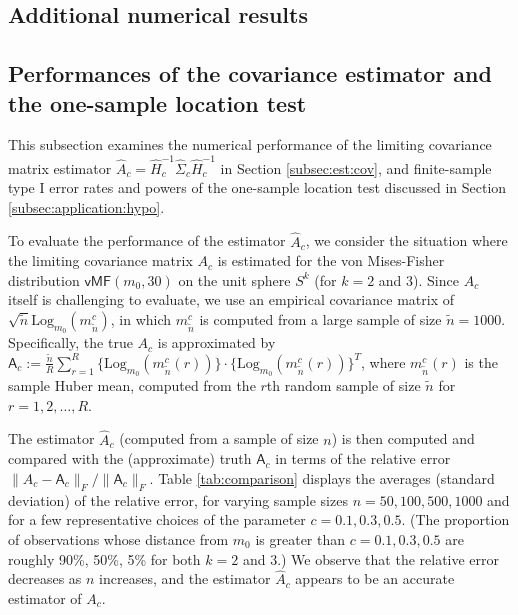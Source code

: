 \documentclass[preprint]{imsart}
\theoremstyle{plain}
\theoremstyle{remark}
\begin{document}
\begin{appendix}
\color{black}
\section{Additional numerical results}



\subsection{Performances of the covariance estimator and the one-sample location test}


This subsection examines the numerical performance of the limiting covariance matrix estimator $\hat{A}_c = \hat{H}_c^{-1} \hat\Sigma_c \hat{H}_c^{-1} $ in Section \ref{subsec:est:cov}, and finite-sample type I error rates and powers of the one-sample location test discussed in Section \ref{subsec:application:hypo}.

To evaluate the performance of the estimator $\hat{A}_c$, we consider the situation where the limiting covariance matrix $A_c$ is estimated for the von Mises-Fisher distribution $\textsf{vMF}(m_0, 30)$ on the unit sphere $S^k$ (for $k = 2$ and $3$). Since $A_c$ itself is challenging to evaluate, we use an empirical covariance matrix of $\sqrt{{\tilde{n}}} \mbox{Log}_{m_0}(m_{\tilde{n}}^c)$, in which $m_{\tilde{n}}^c$ is computed from a large sample of size $ {\tilde{n}} = 1000$. Specifically, the true $A_c$ is approximated by $\textsf{A}_c := \frac{{\tilde{n}}}{R}\sum_{r= 1}^R  \{\mbox{Log}_{m_0}(m_{{\tilde{n}}}^c(r)) \} \cdot\{\mbox{Log}_{m_0}(m_{{\tilde{n}}}^c(r)) \}^T$, where $m_{{\tilde{n}}}^c(r)$ is the sample Huber mean, computed from the $r$th random sample of size ${\tilde{n}}$ for $r= 1, 2, \ldots, R$.
%

The estimator $\hat{A}_c$ (computed from a sample of size $n$) is then computed and compared with the (approximate) truth $\textsf{A}_c$ in terms of the relative error $\| \hat{A}_c - \textsf{A}_c\|_F /\| \textsf{A}_c\|_F$. Table \ref{tab:comparison} displays the averages (standard deviation) of the relative error, for varying sample sizes $n = 50, 100, 500, 1000$ and for a few representative choices of the parameter $c = 0.1, 0.3, 0.5$. (The proportion of observations whose distance from $m_0$ is greater than $c = 0.1, 0.3, 0.5$ are roughly 90\%, 50\%, 5\% for both $k = 2$ and $3$.) We observe that the relative error decreases as $n$ increases, and the estimator $\hat{A}_c$ appears to be an accurate estimator of $A_c$. 


\end{appendix}
\end{document}

